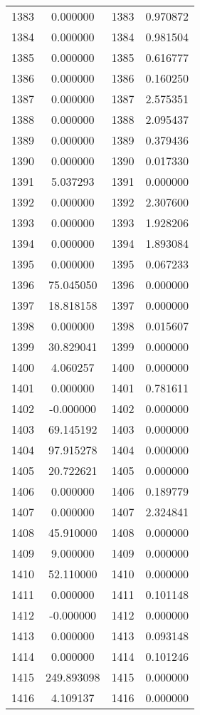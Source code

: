 \documentclass[12pt]{article}
\begin{document}
\begin{longtable}{@{}cccc@{}}
1383 & 0.000000 & 1383 & 0.970872 \\
1384 & 0.000000 & 1384 & 0.981504 \\
1385 & 0.000000 & 1385 & 0.616777 \\
1386 & 0.000000 & 1386 & 0.160250 \\
1387 & 0.000000 & 1387 & 2.575351 \\
1388 & 0.000000 & 1388 & 2.095437 \\
1389 & 0.000000 & 1389 & 0.379436 \\
1390 & 0.000000 & 1390 & 0.017330 \\
1391 & 5.037293 & 1391 & 0.000000 \\
1392 & 0.000000 & 1392 & 2.307600 \\
1393 & 0.000000 & 1393 & 1.928206 \\
1394 & 0.000000 & 1394 & 1.893084 \\
1395 & 0.000000 & 1395 & 0.067233 \\
1396 & 75.045050 & 1396 & 0.000000 \\
1397 & 18.818158 & 1397 & 0.000000 \\
1398 & 0.000000 & 1398 & 0.015607 \\
1399 & 30.829041 & 1399 & 0.000000 \\
1400 & 4.060257 & 1400 & 0.000000 \\
1401 & 0.000000 & 1401 & 0.781611 \\
1402 & -0.000000 & 1402 & 0.000000 \\
1403 & 69.145192 & 1403 & 0.000000 \\
1404 & 97.915278 & 1404 & 0.000000 \\
1405 & 20.722621 & 1405 & 0.000000 \\
1406 & 0.000000 & 1406 & 0.189779 \\
1407 & 0.000000 & 1407 & 2.324841 \\
1408 & 45.910000 & 1408 & 0.000000 \\
1409 & 9.000000 & 1409 & 0.000000 \\
1410 & 52.110000 & 1410 & 0.000000 \\
1411 & 0.000000 & 1411 & 0.101148 \\
1412 & -0.000000 & 1412 & 0.000000 \\
1413 & 0.000000 & 1413 & 0.093148 \\
1414 & 0.000000 & 1414 & 0.101246 \\
1415 & 249.893098 & 1415 & 0.000000 \\
1416 & 4.109137 & 1416 & 0.000000 \\

\end{longtable}
\end{document}
